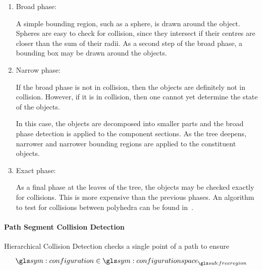 				\begin{enumerate}

					\item Broad phase:

						A simple bounding region, such as a sphere, is drawn
						around the object. Spheres are easy to check for
						collision, since they intersect if their centres are
						closer than the sum of their radii. As a second step of
						the broad phase, a bounding box may be drawn around the
						objects.

					\item Narrow phase:

						If the broad phase is not in collision, then the objects
						are definitely not in collision. However, if it is in
						collision, then one cannot yet determine the state of
						the objects.

						In this case, the objects are decomposed into smaller
						parts and the broad phase detection is applied to the
						component sections. As the tree deepens, narrower and
						narrower bounding regions are applied to the constituent
						objects.


					\item Exact phase:

						As a final phase at the leaves of the tree, the objects
						may be checked exactly for collisions. This is more
						expensive than the previous phases. An algorithm to test
						for collisions between polyhedra can be found
						in~\cite{bib:planning:detecting_intersections_between_convex_polyhedra}.

				\end{enumerate}

			\paragraph{Path Segment Collision Detection}%
			\label{sec:path_segment_collision_detection}

				Hierarchical Collision Detection checks a single point of a
				path to ensure

				\begin{equation}
					\configuration \in \configurationspace_{\freeregion}
				\end{equation}

